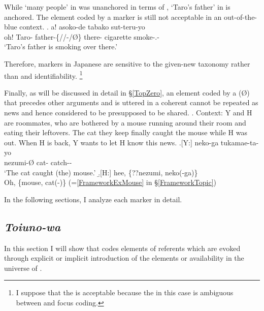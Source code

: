 While  `many people' in \Last was unanchored in terms of ,
 `Taro's father' in \Next is anchored.
The element coded by a  marker is still not acceptable in an out-of-the-blue context.
%
\exg. a!   asoko-de tabako sut-teru-yo \\
 oh! Taro- father-\{//-/{\O}\} there- cigarette smoke-.- \\
 `Taro's father is smoking over there.'

Therefore,  markers in Japanese are sensitive to the given-new taxonomy rather than  and identifiability.%
 \footnote{
 I suppose that the  is acceptable
 because the  in this case is ambiguous between  and focus coding.
 }

Finally, as will be discussed in detail in \S \ref{TopZero},
an element coded by a  ({\O}) that precedes other arguments and is uttered in a coherent 
cannot be repeated as news and hence considered to be presupposed to be shared.
\ex. \label{mouse}Context: Y and H are roommates,
	who are bothered by a mouse running around their room
	and eating their leftovers.
	The cat they keep finally caught the mouse while H was out.
	When H is back, Y wants to let H know this news.
	\ag.[Y:]  neko-ga tukamae-ta-yo \\
		nezumi-{\O} cat- catch-- \\
		`The cat caught (the) mouse.'
	\b.[H:] hee, \{??nezumi, neko(-ga)\} \\
	  Oh, \{mouse, cat(-)\}
	  \hfill{(=\ref{FrameworkExMouse} in \S \ref{FrameworkTopic})}


In the following sections,
I analyze each  marker in detail.

\subsection{\textit{Toiuno-wa}}\label{Toiunowa}

In this section
I will show that  codes elements of referents
which are evoked
through explicit or implicit introduction of the elements or
availability in the universe of .

